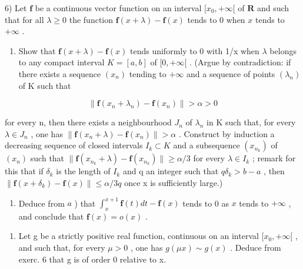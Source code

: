 6) Let \(\mathbf{f}\) be a continuous vector function on an interval \([x_0, +\infty[\) of \(\mathbf{R}\) and such that for all \(\lambda \geqslant 0\) the function \(\mathbf{f}(x + \lambda) - \mathbf{f}(x)\) tends to 0 when \(x\) tends to \(+\infty\) .

\begin{enumerate}
\def\labelenumi{\alph{enumi})}
\tightlist
\item
  Show that \(\mathbf{f}(x+\lambda)-\mathbf{f}(x)\) tends uniformly to 0 with 1/x when \(\lambda\) belongs to any compact interval \(K=[a,b]\) of \([0,+\infty[\) . (Argue by contradiction: if there exists a sequence \((x_{n})\) tending to \(+\infty\) and a sequence of points \((\lambda_{n})\) of K such that
\end{enumerate}

\[
\| \mathbf {f} (x _ {n} + \lambda_ {n}) - \mathbf {f} (x _ {n}) \| > \alpha > 0
\]

for every n, then there exists a neighbourhood \(J_{n}\) of \(\lambda_{n}\) in K such that, for every \(\lambda \in J_{n}\) , one has \(\|\mathbf{f}(x_{n} + \lambda) - \mathbf{f}(x_{n})\| > \alpha\) . Construct by induction a decreasing sequence of closed intervals \(I_{k} \subset K\) and a subsequence \((x_{n_{k}})\) of \((x_{n})\) such that \(\|\mathbf{f}(x_{n_{k}} + \lambda) - \mathbf{f}(x_{n_{k}})\| \geqslant \alpha/3\) for every \(\lambda \in I_{k}\) ; remark for this that if \(\delta_{k}\) is the length of \(I_{k}\) and q an integer such that \(q\delta_{k} > b - a\) , then \(\|\mathbf{f}(x + \delta_{k}) - \mathbf{f}(x)\| \leqslant \alpha/3q\) once x is sufficiently large.)

\begin{enumerate}
\def\labelenumi{\alph{enumi})}
\setcounter{enumi}{1}
\tightlist
\item
  Deduce from \(a\) ) that \(\int_{x}^{x + 1}\mathbf{f}(t)dt - \mathbf{f}(x)\) tends to 0 as \(x\) tends to \(+\infty\) , and conclude that \(\mathbf{f}(x) = o(x)\) .
\end{enumerate}

\begin{enumerate}
\def\labelenumi{\arabic{enumi})}
\setcounter{enumi}{6}
\tightlist
\item
  Let g be a strictly positive real function, continuous on an interval \([x_{0}, +\infty[\) , and such that, for every \(\mu > 0\) , one has \(g(\mu x) \sim g(x)\) . Deduce from exerc. 6 that g is of order 0 relative to x.
\end{enumerate}

